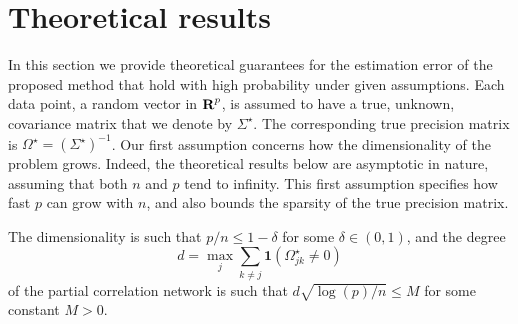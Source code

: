 \documentclass{article}
\begin{document}
    
    
    




\section{Theoretical results}

In this section we provide theoretical guarantees for the estimation error of
the proposed method that hold with high probability under given assumptions. 
Each data point, a random vector in ${\mbox{\bf R}}^p$, is assumed to have a true,
unknown, covariance matrix that we denote by $\Sigma^\star$. The corresponding
true precision matrix is $\Omega^\star = (\Sigma^\star)^{-1}$. Our first
assumption concerns how the dimensionality of the problem grows. Indeed, the
theoretical results below are asymptotic in nature, assuming that both $n$ and
$p$ tend to infinity. This first assumption specifies how fast $p$ can grow
with $n$, and also bounds the sparsity of the true precision matrix.

\begin{assumption}\label{assumption:dimensionality}    
The dimensionality is such that $p/n \leq 1 - \delta$ for some $\delta \in (0,
1)$, and the degree
\[
    d = \max_j \sum_{k\neq j} \mathbf{1}(\Omega_{jk}^\star \neq 0)
\]
of the partial correlation network is such that $d\sqrt{\log (p)/n}\leq M$ for
some constant $M>0$.  
\end{assumption}
\end{document}

